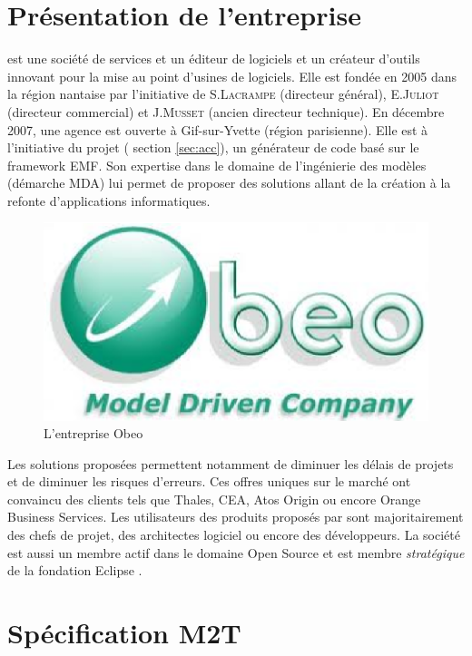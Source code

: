 \section{Présentation de l'entreprise}
\kwobeo{} est une société de services et un éditeur de logiciels et un créateur d'outils innovant pour la mise au point d'usines de logiciels\cite{obeo}.  Elle est fondée en 2005 dans la région nantaise par l'initiative de S.\textsc{Lacrampe} (directeur général), E.\textsc{Juliot} (directeur commercial) et J.\textsc{Musset} (ancien directeur technique). En décembre 2007, une agence est ouverte à Gif-sur-Yvette (région parisienne). Elle est à l'initiative du projet \kwacceleo{} (\cf{} section \ref{sec:acc}), un générateur de code basé sur le framework EMF. Son expertise dans le domaine de l'ingénierie des modèles (démarche MDA) lui permet de proposer des solutions allant de la création à la refonte d'applications informatiques. 
\begin{figure}[htb]
  \centering
  \includegraphics[scale=.45]{img/logoobeo.eps}
  \caption{L'entreprise Obeo}
\end{figure}


Les solutions proposées permettent notamment de diminuer les délais de projets et de diminuer les risques d'erreurs. Ces offres uniques sur le marché ont convaincu des clients tels que Thales, CEA, Atos Origin ou encore Orange Business Services. Les utilisateurs des produits proposés par \kwobeo sont majoritairement des chefs de projet, des architectes logiciel ou encore des développeurs.
La société \kwobeo{} est aussi un membre actif dans le domaine Open Source et est membre \emph{stratégique} de la fondation Eclipse \cite{fondation}.

\clearpage

\section{Spécification M2T}\label{sec:m2t}

